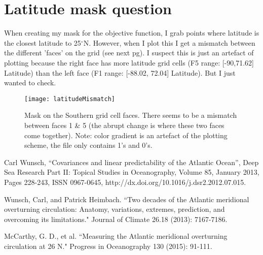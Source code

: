\documentclass[a4paper,11pt]{article}
\begin{document}
  


  
  
\section{Latitude mask question}
  
  When creating my mask for the objective function, I grab points where latitude is the closest latitude to 25$^{\circ}$N. However, when I plot this I get a mismatch between the different 'faces' on the grid (see next pg). I suspect this is just an artefact of plotting because the right face has more latitude grid cells (F5 range: [-90,71.62] Latitude) than the left face (F1 range: [-88.02, 72.04] Latitude). But I just wanted to check.
  
  \begin{figure}
   \centering
   \texttt{[image: latitudeMismatch]}
   \label{fig:latitudeMismatch}
   \caption{Mask on the Southern grid cell faces. There seems to be a mismatch between faces 1 \& 5 (the abrupt change is where these two faces come together). Note: color gradient is an artefact of the plotting scheme, the file only contains 1's and 0's.}
  \end{figure}

  
\begin{thebibliography}{3}

  Carl Wunsch, ``Covariances and linear predictability of the Atlantic Ocean'', Deep Sea Research Part II: Topical Studies in Oceanography, Volume 85, January 2013, Pages 228-243, ISSN 0967-0645, http://dx.doi.org/10.1016/j.dsr2.2012.07.015.
  
  Wunsch, Carl, and Patrick Heimbach. ``Two decades of the Atlantic meridional overturning circulation: Anatomy, variations, extremes, prediction, and overcoming its limitations." Journal of Climate 26.18 (2013): 7167-7186.
  
  McCarthy, G. D., et al. ``Measuring the Atlantic meridional overturning circulation at 26 N." Progress in Oceanography 130 (2015): 91-111.

\end{thebibliography}
\end{document}
